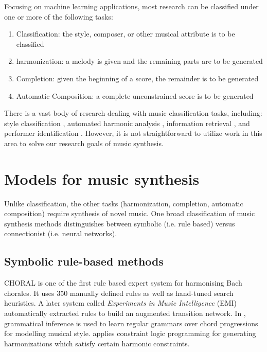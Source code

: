 \documentclass[dissertation.tex]{subfiles}
\begin{document}
Focusing on machine learning applications, most research can be
classified under one or more of the following tasks:
\begin{enumerate}
  \item Classification: the style, composer, or other musical attribute is to be classified
  \item harmonization: a melody is given and the remaining parts are to be generated
  \item Completion: given the beginning of a score, the remainder is to be generated
  \item Automatic Composition: a complete unconstrained score is to be generated
\end{enumerate}

There is a vast body of research dealing with music classification tasks,
including: style classification \cite{Herlands2014}
\cite{dannenberg1997machine}, automated harmonic analysis \cite{ni2012end},
information retrieval \cite{mandel2006support}, and performer identification
\cite{stamatatos2005automatic}. However, it is not straightforward to utilize
work in this area to solve our research goals of music synthesis.

\section{Models for music synthesis}

Unlike classification, the other tasks (harmonization, completion, automatic
composition) require synthesis of novel music. One broad classification of
music synthesis methods \cite{toiviainen2000symbolic} distinguishes between
symbolic (i.e. rule based) versus connectionist (i.e. neural networks).

\subsection{Symbolic rule-based methods}

CHORAL \cite{ebciouglu1988expert} is one of the first rule based expert system
for harmonising Bach chorales. It uses 350 manually defined rules as well as
hand-tuned search heuristics. A later system called \emph{Experiments in Music
Intelligence} (EMI) \cite{cope1992computer} automatically extracted rules to
build an augmented transition network\cite{wanner1980atn}. In
\cite{cruz1998learning}, grammatical inference is used to learn regular
grammars over chord progressions for modelling musical style.
\cite{tsang1991harmonizing} applies constraint logic programming for generating
harmonizations which satisfy certain harmonic constraints.
\end{document}
